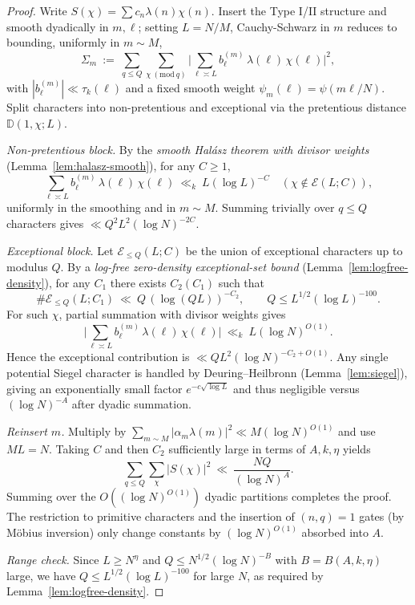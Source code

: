 \documentclass[11pt]{article}
\theoremstyle{definition}
\theoremstyle{remark}
\begin{document}
\begin{proof}
Write $S(\chi)=\sum c_n\lambda(n)\chi(n)$. Insert the Type I/II structure and smooth dyadically in $m,\ell$; setting $L=N/M$, Cauchy-Schwarz in $m$ reduces to bounding, uniformly in $m\sim M$,
\[
\Sigma_m\ :=\ \sum_{q\le Q}\sum_{\chi\ (\mathrm{mod}\ q)}\Big|\sum_{\ell\asymp L} b^{(m)}_\ell\,\lambda(\ell)\,\chi(\ell)\Big|^2,
\]
with $|b^{(m)}_\ell|\ll\tau_k(\ell)$ and a fixed smooth weight $\psi_m(\ell)=\psi(m\ell/N)$. Split characters into non-pretentious and exceptional via the pretentious distance $\mathbb D(1,\chi;L)$.

\emph{Non-pretentious block.} By the \emph{smooth Hal\'asz theorem with divisor weights} (Lemma~\ref{lem:halasz-smooth}), for any $C\ge 1$,
\[
\sum_{\ell\asymp L} b^{(m)}_\ell\,\lambda(\ell)\,\chi(\ell)\ \ll_{k}\ L(\log L)^{-C}
\quad(\chi\notin\mathcal E(L;C)),
\]
uniformly in the smoothing and in $m\sim M$. Summing trivially over $q\le Q$ characters gives $\ll Q^2 L^2(\log N)^{-2C}$.

\emph{Exceptional block.} Let $\mathcal E_{\le Q}(L;C)$ be the union of exceptional characters up to modulus $Q$. By a \emph{log-free zero-density exceptional-set bound} (Lemma~\ref{lem:logfree-density}), for any $C_1$ there exists $C_2(C_1)$ such that
\[
\#\mathcal E_{\le Q}(L;C_1)\ \ll\ Q\,(\log (QL))^{-C_2},\qquad Q\le L^{1/2}(\log L)^{-100}.
\]
For such $\chi$, partial summation with divisor weights gives
\[
\Big|\sum_{\ell\asymp L} b^{(m)}_\ell\,\lambda(\ell)\,\chi(\ell)\Big|\ \ll_{k}\ L(\log N)^{O(1)}.
\]
Hence the exceptional contribution is $\ll Q L^2 (\log N)^{-C_2+O(1)}$. Any single potential Siegel character is handled by Deuring–Heilbronn (Lemma~\ref{lem:siegel}), giving an exponentially small factor $e^{-c\sqrt{\log L}}$ and thus negligible versus $(\log N)^{-A}$ after dyadic summation.

\emph{Reinsert $m$.} Multiply by $\sum_{m\sim M}|\alpha_m\lambda(m)|^2\ll M(\log N)^{O(1)}$ and use $ML=N$. Taking $C$ and then $C_2$ sufficiently large in terms of $A,k,\eta$ yields
\[
\sum_{q\le Q}\sum_{\chi}|S(\chi)|^2\ \ll\ \frac{NQ}{(\log N)^A}.
\]
Summing over the $O((\log N)^{O(1)})$ dyadic partitions completes the proof. The restriction to primitive characters and the insertion of $(n,q)=1$ gates (by M\"obius inversion) only change constants by $(\log N)^{O(1)}$ absorbed into $A$.

\emph{Range check.} Since $L\ge N^{\eta}$ and $Q\le N^{1/2}(\log N)^{-B}$ with $B=B(A,k,\eta)$ large, we have $Q\le L^{1/2}(\log L)^{-100}$ for large $N$, as required by Lemma~\ref{lem:logfree-density}.
\end{proof}
\end{document}
